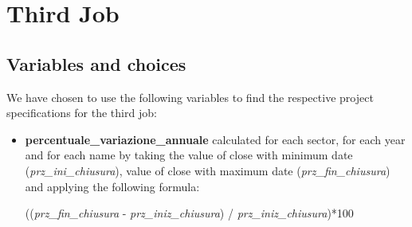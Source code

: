 \documentclass[]{report}
\begin{document}
\chapter*{Third Job}

\section*{Variables and choices}
We have chosen to use the following variables to find the respective project specifications for the third job:
\begin{itemize}
	\item \textbf{percentuale\_variazione\_annuale} calculated for each sector, for each year and for each name by taking the value of close with minimum date (\textit{prz\_ini\_chiusura}), value of close with maximum date (\textit{prz\_fin\_chiusura}) and applying the following formula:
	\begin{center}
		((\textit{prz\_fin\_chiusura} - \textit{prz\_iniz\_chiusura}) / \textit{prz\_iniz\_chiusura})*100 
	\end{center}
	
\end{itemize}
\end{document}

